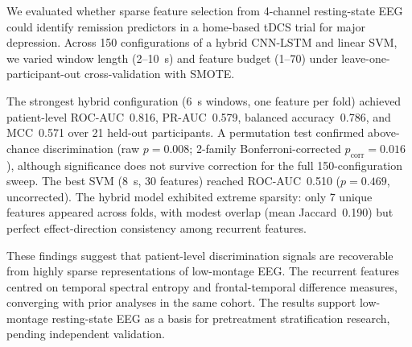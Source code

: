 We evaluated whether sparse feature selection from 4-channel resting-state EEG could identify remission predictors in a home-based tDCS trial for major depression. Across 150 configurations of a hybrid CNN-LSTM and linear SVM, we varied window length (2--10~s) and feature budget (1--70) under leave-one-participant-out cross-validation with SMOTE.

The strongest hybrid configuration (6~s windows, one feature per fold) achieved patient-level ROC-AUC~0.816, PR-AUC~0.579, balanced accuracy~0.786, and MCC~0.571 over 21 held-out participants. A permutation test confirmed above-chance discrimination (raw $p=0.008$; 2-family Bonferroni-corrected $p_\text{corr}=0.016$), although significance does not survive correction for the full 150-configuration sweep. The best SVM (8~s, 30 features) reached ROC-AUC~0.510 ($p=0.469$, uncorrected). The hybrid model exhibited extreme sparsity: only 7 unique features appeared across folds, with modest overlap (mean Jaccard~0.190) but perfect effect-direction consistency among recurrent features.

These findings suggest that patient-level discrimination signals are recoverable from highly sparse representations of low-montage EEG. The recurrent features centred on temporal spectral entropy and frontal-temporal difference measures, converging with prior analyses in the same cohort. The results support low-montage resting-state EEG as a basis for pretreatment stratification research, pending independent validation.
